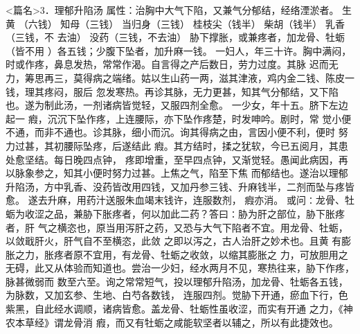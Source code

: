 \documentclass[a4paper,12pt,UTF8,twoside]{ctexbook}
\begin{document}
<篇名>3．理郁升陷汤
属性：治胸中大气下陷，又兼气分郁结，经络湮淤者。 
生黄 （六钱） 知母（三钱） 当归身（三钱） 桂枝尖（钱半） 柴胡（钱半） 乳香（三钱，不 
去油） 没药（三钱，不去油） 
胁下撑胀，或兼疼者，加龙骨、牡蛎（皆不用 ）各五钱；少腹下坠者，加升麻一钱。 
一妇人，年三十许。胸中满闷，时或作疼，鼻息发热，常常作渴。自言得之产后数日，劳力过度。其脉 
迟而无力，筹思再三，莫得病之端绪。姑以生山药一两，滋其津液，鸡内金二钱、陈皮一钱，理其疼闷，服后 
忽发寒热。再诊其脉，无力更甚，知其气分郁结，又下陷也。遂为制此汤，一剂诸病皆觉轻，又服四剂全愈。 
一少女，年十五。脐下左边起一 瘕，沉沉下坠作疼，上连腰际，亦下坠作疼楚，时发呻吟。剧时，常 
觉小便不通，而非不通也。诊其脉，细小而沉。询其得病之由，言因小便不利，便时 
努力过甚，其初腰际坠疼，后遂结此 瘕。其方结时，揉之犹软，今已五阅月，其患处愈坚结。每日晚四点钟， 
疼即增重，至早四点钟，又渐觉轻。愚闻此病因，再以脉象参之，知其小便时努力过甚。上焦之气，陷至下焦 
而郁结也。遂治以理郁升陷汤，方中乳香、没药皆改用四钱，又加丹参三钱、升麻钱半，二剂而坠与疼皆愈。 
遂去升麻，用药汁送服朱血竭末钱许，连服数剂， 瘕亦消。 
或问∶龙骨、牡蛎为收涩之品，兼胁下胀疼者，何以加此二药？答曰∶胁为肝之部位，胁下胀疼者，肝 
气之横恣也，原当用泻肝之药，又恐与大气下陷者不宜。用龙骨、牡蛎，以敛戢肝火，肝气自不至横恣，此敛 
之即以泻之，古人治肝之妙术也。且黄 有膨胀之力，胀疼者原不宜用，有龙骨、牡蛎之收敛，以缩其膨胀之 
力，可放胆用之无碍，此又从体验而知道也。尝治一少妇，经水两月不见，寒热往来，胁下作疼，脉甚微弱而 
数至六至。询之常常短气，投以理郁升陷汤，加龙骨、牡蛎各五钱，为脉数，又加玄参、生地、白芍各数钱， 
连服四剂。觉胁下开通，瘀血下行，色紫黑，自此经水调顺，诸病皆愈。盖龙骨、牡蛎性虽收涩，而实有开通 
之力，《神农本草经》谓龙骨消 瘕，而又有牡蛎之咸能软坚者以辅之，所以有此捷效也。 
\end{document}
